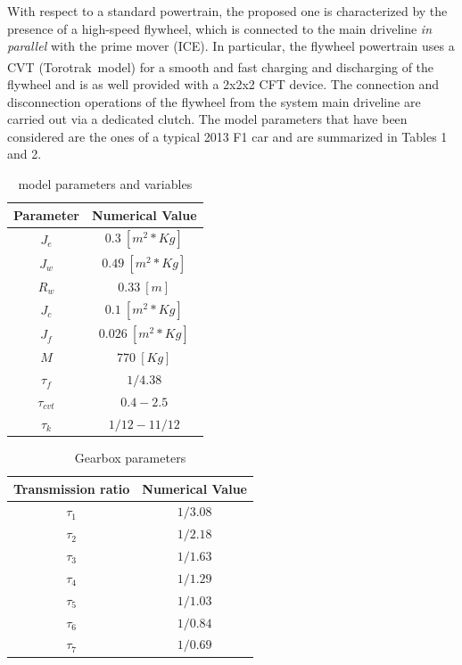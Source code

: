 \documentclass[11pt]{article}
\begin{document}
With respect to a standard powertrain, the proposed one is characterized by the presence of a high-speed flywheel, which is connected to the main driveline \textit{in parallel} with the prime mover (ICE). In particular, the flywheel powertrain uses a CVT (Torotrak\textsuperscript\textregistered\ model) for a smooth and fast charging and discharging of the flywheel and is as well provided with a 2x2x2 CFT device. The connection and disconnection operations of the flywheel from the system main driveline are carried out via a dedicated clutch. The model parameters that have been considered are the ones of a typical 2013 F1 car and are summarized in Tables 1 and 2.

\begin{table}[H]
\centering
\begin{tabular}{|c|c|}
 \hline 
 Parameter & Numerical Value\\ 
 \hline 
 $J_e$ &  $0.3\ [m^2*Kg]$\\   
 $J_w$ & $0.49\ [m^2*Kg]$ \\ 
 $R_w$ & $0.33\ [m]$ \\  
 $J_c$ & $0.1\ [m^2*Kg]$ \\ 
 $J_f$ & $0.026\ [m^2*Kg]$ \\  
 $M$ & $770\ [Kg]$ \\
 $\tau_f$ & $1/4.38$ \\
 $\tau_{cvt}$ & $0.4-2.5$ \\
 $\tau_k$ & $1/12-11/12$ \\  
 \hline 
\end{tabular} 
\label{params}
\caption{model parameters and variables}
\end{table}

\begin{table}[H]
\centering
\begin{tabular}{|c|c|}
 \hline 
 Transmission ratio & Numerical Value\\ 
 \hline 
 $\tau_1$ &  $1/3.08$\\  
 $\tau_2$ & $1/2.18$ \\ 
 $\tau_3$ & $1/1.63$ \\ 
 $\tau_4$ & $1/1.29$ \\  
 $\tau_5$ & $1/1.03$ \\ 
 $\tau_6$ & $1/0.84$ \\  
 $\tau_7$ & $1/0.69$ \\  
 \hline 
\end{tabular} 
\caption{Gearbox parameters }
\end{table}
\end{document}
